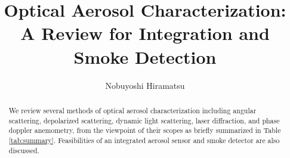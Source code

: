 \documentclass[12pt]{article}
\begin{document}
\title{Optical Aerosol Characterization: A Review for Integration and Smoke Detection}
\author{Nobuyoshi Hiramatsu}
\maketitle 

\begin{abstract}
We review several methods of optical aerosol characterization including angular scattering, depolarized scattering, dynamic light scattering, laser diffraction, and phase doppler anemometry, from the viewpoint of their scopes as briefly summarized in Table \ref{tab:summary}. Feasibilities of an integrated aerosol sensor and smoke detector are also discussed.
\end{abstract}

\begin{table}[H]
 \begin{center}
 \label{heading}
\small
{}
 \caption{The principle and the scope of aerosol characterization systems\cite{Review}\cite{Review_pharmaceutics}\cite{Review_comparison}}
\label{tab:summary}
 \end{center}
 \end{table}
\end{document}
